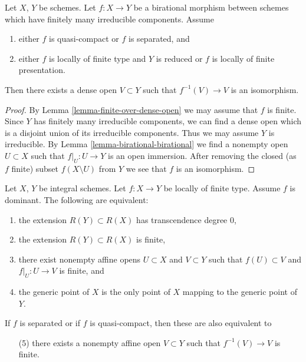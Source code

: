 \begin{lemma}
\label{lemma-birational-isomorphism-over-dense-open}
Let $X$, $Y$ be schemes. Let $f : X \to Y$ be a birational morphism
between schemes which have finitely many irreducible components.
Assume
\begin{enumerate}
\item either $f$ is quasi-compact or $f$ is separated, and
\item either $f$ is locally of finite type and $Y$ is reduced or
$f$ is locally of finite presentation.
\end{enumerate}
Then there exists a dense open $V \subset Y$
such that $f^{-1}(V) \to V$ is an isomorphism.
\end{lemma}

\begin{proof}
By Lemma \ref{lemma-finite-over-dense-open} we may assume that $f$ is finite.
Since $Y$ has finitely many irreducible components, we can find a dense
open which is a disjoint union of its irreducible components. Thus we may
assume $Y$ is irreducible. By Lemma \ref{lemma-birational-birational} we find
a nonempty open $U \subset X$ such that $f|_U : U \to Y$ is an open immersion.
After removing the closed (as $f$ finite)
subset $f(X \setminus U)$ from $Y$ we see that $f$ is an isomorphism.
\end{proof}

\begin{lemma}
\label{lemma-finite-degree}
Let $X$, $Y$ be integral schemes.
Let $f : X \to Y$ be locally of finite type.
Assume $f$ is dominant.
The following are equivalent:
\begin{enumerate}
\item the extension $R(Y) \subset R(X)$ has
transcendence degree $0$,
\item the extension $R(Y) \subset R(X)$ is finite,
\item there exist nonempty affine opens $U \subset X$
and $V \subset Y$ such that $f(U) \subset V$
and $f|_U : U \to V$ is finite, and
\item the generic point of $X$ is the only point of $X$ mapping to
the generic point of $Y$.
\end{enumerate}
If $f$ is separated or if $f$ is quasi-compact, then these are
also equivalent to
\begin{enumerate}
\item[(5)] there exists a nonempty affine open $V \subset Y$ such
that $f^{-1}(V) \to V$ is finite.
\end{enumerate}
\end{lemma}

